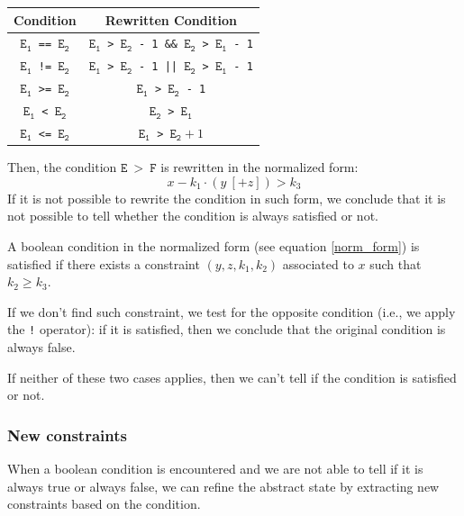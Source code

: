 \documentclass{article}
\begin{document}
\begin{table}[H]
\centering
\begin{tabular}{|c|c|}
\hline
Condition    & Rewritten Condition        \\ \hline
\texttt{$\mathtt{E_1}$ == $\mathtt{E_2}$} & \texttt{$\mathtt{E_1}$ > $\mathtt{E_2}$ - 1 \&\& $\mathtt{E_2}$ > $\mathtt{E_1}$ - 1} \\ \hline
\texttt{$\mathtt{E_1}$ != $\mathtt{E_2}$} & \texttt{$\mathtt{E_1}$ > $\mathtt{E_2}$ - 1 || $\mathtt{E_2}$ > $\mathtt{E_1}$ - 1} \\ \hline
\texttt{$\mathtt{E_1}$ >= $\mathtt{E_2}$} & \texttt{$\mathtt{E_1}$ > $\mathtt{E_2}$ - 1}          \\ \hline
\texttt{$\mathtt{E_1}$ < $\mathtt{E_2}$}  & \texttt{$\mathtt{E_2}$ > $\mathtt{E_1}$}                \\ \hline
\texttt{$\mathtt{E_1}$ <= $\mathtt{E_2}$} & \texttt{$\mathtt{E_1}$ > $\mathtt{E_2} + 1$}             \\ \hline
\end{tabular}
\end{table}
\noindent
Then, the condition $\mathtt{E\ >\ F}$ is rewritten in the normalized form:
\begin{equation}
    \label{norm_form}
    x - k_1 \cdot (y\ [+z]) > k_3
\end{equation}
\noindent
If it is not possible to rewrite the condition in such form, we conclude that it is not possible to tell whether the condition is always satisfied or not.

A boolean condition in the normalized form (see equation \ref{norm_form}) is satisfied if there exists a constraint $(y, z, k_1, k_2)$ associated to $x$ such that $k_2 \geq k_3$.

If we don't find such constraint, we test for the opposite condition (i.e., we apply the \texttt{!} operator): if it is satisfied, then we conclude that the original condition is always false.

If neither of these two cases applies, then we can't tell if the condition is satisfied or not.


\subsubsection{New constraints}
\label{new_cond_constraints}

When a boolean condition is encountered and we are not able to tell if it is always true or always false, we can refine the abstract state by extracting new constraints based on the condition.
\end{document}
